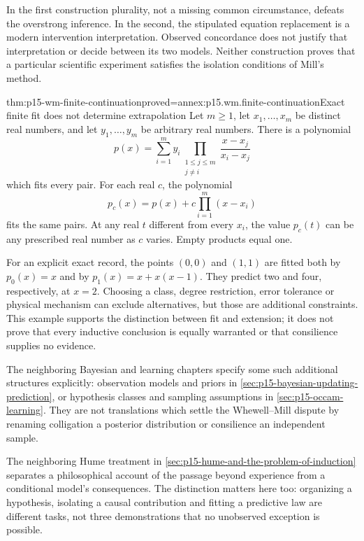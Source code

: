 In the first construction plurality, not a missing common circumstance,
defeats the overstrong inference. In the second, the stipulated equation
replacement is a modern intervention interpretation. Observed concordance
does not justify that interpretation or decide between its two models.
Neither construction proves that a particular scientific experiment
satisfies the isolation conditions of Mill's method.

\begin{hbtheorem}{thm:p15-wm-finite-continuation}{proved=annex:p15.wm.finite-continuation}{Exact finite fit does not determine extrapolation}
Let \(m\geq1\), let \(x_1,\ldots,x_m\) be distinct real numbers, and
let \(y_1,\ldots,y_m\) be arbitrary real numbers. There is a polynomial
\[
 p(x)=\sum_{i=1}^m y_i
             \prod_{\substack{1\leq j\leq m\\j\ne i}}
                    \frac{x-x_j}{x_i-x_j}
\]
which fits every pair. For each real \(c\), the polynomial
\[
 p_c(x)=p(x)+c\prod_{i=1}^m(x-x_i)
\]
fits the same pairs. At any real \(t\) different from every \(x_i\),
the value \(p_c(t)\) can be any prescribed real number as \(c\) varies.
Empty products equal one.
\end{hbtheorem}

For an explicit exact record, the points \((0,0)\) and \((1,1)\)
are fitted both by \(p_0(x)=x\) and by \(p_1(x)=x+x(x-1)\).
They predict two and four, respectively, at \(x=2\).
Choosing a class, degree restriction, error tolerance or physical mechanism
can exclude alternatives, but those are additional constraints.
This example supports the distinction between fit and extension; it does
not prove that every inductive conclusion is equally warranted or that
consilience supplies no evidence.

The neighboring Bayesian and learning chapters specify some such additional
structures explicitly: observation models and priors in
\cref{sec:p15-bayesian-updating-prediction}, or hypothesis classes and
sampling assumptions in \cref{sec:p15-occam-learning}.
They are not translations which settle the Whewell--Mill dispute by
renaming colligation a posterior distribution or consilience an
independent sample.

The neighboring Hume treatment in
\cref{sec:p15-hume-and-the-problem-of-induction} separates a philosophical
account of the passage beyond experience from a conditional model's
consequences. The distinction matters here too: organizing a hypothesis,
isolating a causal contribution and fitting a predictive law are different
tasks, not three demonstrations that no unobserved exception is possible.

